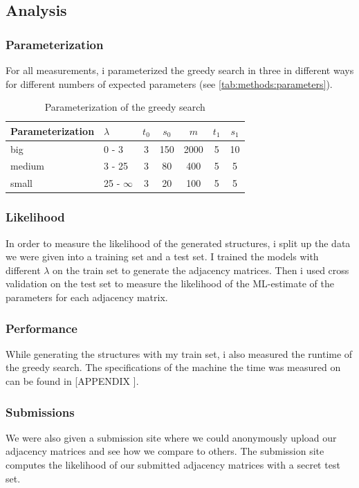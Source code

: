 \documentclass[sigconf, fleqn, prologue, dvipsnames]{acmart}
\def\ndy{%
    \reversemarginpar%
    \marginpar{\raggedleft\textcolor{red}{\rule{2mm}{2mm}}}%
}
\begin{document}
\subsection{Analysis}
\subsubsection{Parameterization}
\label{sec:methods:analysis:parameterization}
For all measurements, i parameterized the greedy search in three in different ways for different numbers of expected parameters (see \autoref{tab:methods:parameters}).

\begin{table}[htbp]
	\caption{Parameterization of the greedy search}
	\label{tab:methods:parameters}
	\begin{tabular}{llccccc}
		\toprule
		Parameterization & $\lambda$     & $t_0$ & $s_0$ & $m$  & $t_1$ & $s_1$ \\
		\midrule
		big              & 0 - 3         & 3     & 150   & 2000 & 5     & 10    \\
		medium           & 3 - 25        & 3     & 80    & 400  & 5     & 5     \\
		small            & 25 - $\infty$ & 3     & 20    & 100  & 5     & 5     \\
		\bottomrule
	\end{tabular}
\end{table}

\subsubsection{Likelihood}
In order to measure the likelihood of the generated structures, i split up the data we were given into a training set and a test set.
I trained the models with different $\lambda$ on the train set to generate the adjacency matrices.
Then i used cross validation on the test set to measure the likelihood of the ML-estimate of the parameters for each adjacency matrix.

\subsubsection{Performance}
While generating the structures with my train set, i also measured the runtime of the greedy search.
The specifications of the machine the time was measured on can be found in [APPENDIX\ndy].

\subsubsection{Submissions}
We were also given a submission site where we could anonymously upload our adjacency matrices and see how we compare to others.
The submission site computes the likelihood of our submitted adjacency matrices with a secret test set.
\end{document}
